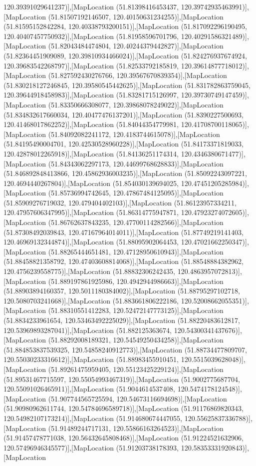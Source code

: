 120.39391029641237)],[MapLocation (51.81398416453437, 120.39742935463991)],[MapLocation (51.81507192146507, 120.40150631234255)],[MapLocation (51.81595152842284, 120.40338793200151)],[MapLocation (51.817092296190495, 120.40407457750932)],[MapLocation (51.81958596701796, 120.40291586321489)],[MapLocation (51.82043484474804, 120.40244379442827)],[MapLocation (51.82364451909089, 120.39810934466024)],[MapLocation (51.824276937674924, 120.39683542268797)],[MapLocation (51.82533792185819, 120.39614877718012)],[MapLocation (51.827592430276766, 120.39567670839354)],[MapLocation (51.830218127246845, 120.39580545442625)],[MapLocation (51.831782863759045, 120.39644918458983)],[MapLocation (51.83281715126997, 120.39730749147459)],[MapLocation (51.83350666308077, 120.39868078249022)],[MapLocation (51.834832617660034, 120.40477476137201)],[MapLocation (51.8390227500693, 120.41468017862252)],[MapLocation (51.84044354779981, 120.41708700118065)],[MapLocation (51.84092082241172, 120.4183744615078)],[MapLocation (51.84195490004701, 120.42530528960228)],[MapLocation (51.84173371819033, 120.42878012265918)],[MapLocation (51.84136251174314, 120.4346380671477)],[MapLocation (51.84343062297173, 120.44699768628833)],[MapLocation (51.846892848413866, 120.45862936003235)],[MapLocation (51.85092243097221, 120.4694440267804)],[MapLocation (51.854030139694025, 120.47451205285984)],[MapLocation (51.85736994742645, 120.47867484125095)],[MapLocation (51.85909276719032, 120.479404402103)],[MapLocation (51.86123957334211, 120.47957606347995)],[MapLocation (51.86314775947871, 120.47923274072605)],[MapLocation (51.86762637843235, 120.47700114282566)],[MapLocation (51.87308492039843, 120.47167964014011)],[MapLocation (51.87749219141403, 120.46969132344874)],[MapLocation (51.88095902064453, 120.47021662250347)],[MapLocation (51.88265444651481, 120.47128950610943)],[MapLocation (51.88458821358792, 120.47403608814068)],[MapLocation (51.88548884382962, 120.4756239558775)],[MapLocation (51.88832306242435, 120.4863957072813)],[MapLocation (51.889197861925986, 120.4942944986663)],[MapLocation (51.88903894160357, 120.5011180384002)],[MapLocation (51.88795297102718, 120.5080703241668)],[MapLocation (51.883661806222186, 120.52008662055351)],[MapLocation (51.88310551412283, 120.52472147773125)],[MapLocation (51.8834233961654, 120.53463492225029)],[MapLocation (51.88220483612817, 120.53969893287041)],[MapLocation (51.882125363674, 120.54300341437676)],[MapLocation (51.88292008189321, 120.54549250434258)],[MapLocation (51.884853837539325, 120.54858240912773)],[MapLocation (51.88734477809707, 120.55030233316612)],[MapLocation (51.88983455910451, 120.5515039628048)],[MapLocation (51.89261475959405, 120.55123425229124)],[MapLocation (51.89531467715597, 120.55054993467319)],[MapLocation (51.9002775687704, 120.55091026465911)],[MapLocation (51.9044614537408, 120.5474178124548)],[MapLocation (51.907744565725594, 120.54673116694698)],[MapLocation (51.90980962611744, 120.54784696589718)],[MapLocation (51.91176869820343, 120.54982107173214)],[MapLocation (51.914680674447055, 120.55625837336788)],[MapLocation (51.91489244717131, 120.55866163264523)],[MapLocation (51.91457478771038, 120.56432645808468)],[MapLocation (51.91224521632906, 120.57496946345577)],[MapLocation (51.91203738178393, 120.58353331920843)],[MapLocation 